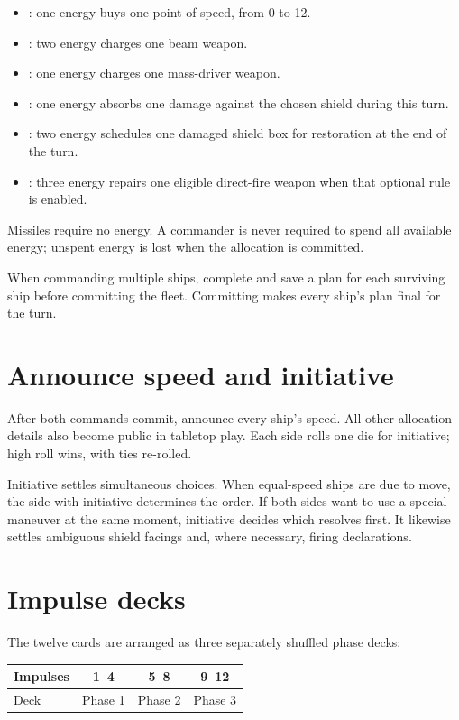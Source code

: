 \begin{itemize}
  \item {}: one energy buys one point of speed, from 0 to 12.
  \item {}: two energy charges one beam weapon.
  \item {}: one energy charges one mass-driver weapon.
  \item {}: one energy absorbs one damage against the chosen shield during this turn.
  \item {}: two energy schedules one damaged shield box for restoration at the end of the turn.
  \item {}: three energy repairs one eligible direct-fire weapon when that optional rule is enabled.
\end{itemize}

Missiles require no energy. A commander is never required to spend all available energy; unspent energy is lost when the allocation is committed.

When commanding multiple ships, complete and save a plan for each surviving ship before committing the fleet. Committing makes every ship's plan final for the turn.

\section{Announce speed and initiative}

After both commands commit, announce every ship's speed. All other allocation details also become public in tabletop play. Each side rolls one die for initiative; high roll wins, with ties re-rolled.

Initiative settles simultaneous choices. When equal-speed ships are due to move, the side with initiative determines the order. If both sides want to use a special maneuver at the same moment, initiative decides which resolves first. It likewise settles ambiguous shield facings and, where necessary, firing declarations.

\section{Impulse decks}

The twelve cards are arranged as three separately shuffled phase decks:

\begin{center}
\begin{tabular}{lccc}\toprule
Impulses & 1--4 & 5--8 & 9--12\\\midrule
Deck & Phase 1 & Phase 2 & Phase 3\\\bottomrule
\end{tabular}
\end{center}

